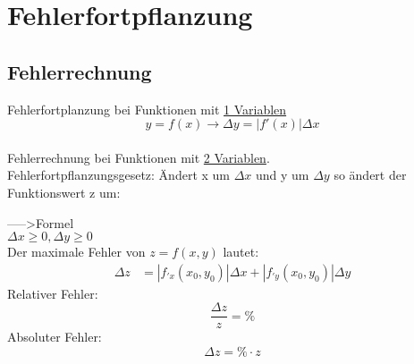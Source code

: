 



\chapter{Fehlerfortpflanzung}
\section{Fehlerrechnung}
Fehlerfortplanzung bei Funktionen mit \underline{1 Variablen}\\
	\[y=f(x) \rightarrow \Delta y = |f'(x)| \Delta x\]
\\
Fehlerrechnung  bei Funktionen mit \underline{2 Variablen}.\\
Fehlerfortpflanzungsgesetz:
Ändert x um $\Delta x$ und y um $\Delta y$ so ändert der Funktionswert z um:

----->Formel
\\
$\Delta x \geqslant 0, \Delta y \geqslant 0$
\newline
\\
Der maximale Fehler von $z=f(x,y)$ lautet:
\[
\boxed{\begin{aligned}	
		\Delta z&=| f_{'x}(x_0,y_0)| \Delta x+ |f_{'y}(x_0,y_0)| \Delta y
	\end{aligned}}\]
\newline
Relativer Fehler: \[\frac{\Delta z}{z}=\%\]
Absoluter Fehler: \[\Delta z=\%\cdot z \]
